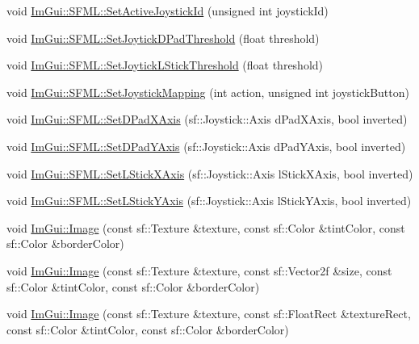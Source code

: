 \begin{DoxyCompactItemize}
\item 
void \mbox{\hyperlink{namespace_im_gui_1_1_s_f_m_l_a51d36e563d2086a841e75a41ecad36b5}{Im\+Gui\+::\+S\+F\+M\+L\+::\+Set\+Active\+Joystick\+Id}} (unsigned int joystick\+Id)
\item 
void \mbox{\hyperlink{namespace_im_gui_1_1_s_f_m_l_a54d0428403fd1887a604b3dc4c8be73b}{Im\+Gui\+::\+S\+F\+M\+L\+::\+Set\+Joytick\+D\+Pad\+Threshold}} (float threshold)
\item 
void \mbox{\hyperlink{namespace_im_gui_1_1_s_f_m_l_a9b55c21ae767d4157720c6bd140bc322}{Im\+Gui\+::\+S\+F\+M\+L\+::\+Set\+Joytick\+L\+Stick\+Threshold}} (float threshold)
\item 
void \mbox{\hyperlink{namespace_im_gui_1_1_s_f_m_l_ad29306aafc29f65a72ec8bcc1e86330f}{Im\+Gui\+::\+S\+F\+M\+L\+::\+Set\+Joystick\+Mapping}} (int action, unsigned int joystick\+Button)
\item 
void \mbox{\hyperlink{namespace_im_gui_1_1_s_f_m_l_ad5fc8ad9c8dfddae6034e86b2a23ff99}{Im\+Gui\+::\+S\+F\+M\+L\+::\+Set\+D\+Pad\+X\+Axis}} (sf\+::\+Joystick\+::\+Axis d\+Pad\+X\+Axis, bool inverted)
\item 
void \mbox{\hyperlink{namespace_im_gui_1_1_s_f_m_l_ad940e87612d00f2a733bfd8813b88523}{Im\+Gui\+::\+S\+F\+M\+L\+::\+Set\+D\+Pad\+Y\+Axis}} (sf\+::\+Joystick\+::\+Axis d\+Pad\+Y\+Axis, bool inverted)
\item 
void \mbox{\hyperlink{namespace_im_gui_1_1_s_f_m_l_a00ca41769ea566cb6210441bfe505028}{Im\+Gui\+::\+S\+F\+M\+L\+::\+Set\+L\+Stick\+X\+Axis}} (sf\+::\+Joystick\+::\+Axis l\+Stick\+X\+Axis, bool inverted)
\item 
void \mbox{\hyperlink{namespace_im_gui_1_1_s_f_m_l_a8e86bef226400c4591343e06670210d7}{Im\+Gui\+::\+S\+F\+M\+L\+::\+Set\+L\+Stick\+Y\+Axis}} (sf\+::\+Joystick\+::\+Axis l\+Stick\+Y\+Axis, bool inverted)
\item 
void \mbox{\hyperlink{namespace_im_gui_a6edd99e13610a7aa37d6befa622a33d5}{Im\+Gui\+::\+Image}} (const sf\+::\+Texture \&texture, const sf\+::\+Color \&tint\+Color, const sf\+::\+Color \&border\+Color)
\item 
void \mbox{\hyperlink{namespace_im_gui_ad6ab801840d7c487d66946ceca63632f}{Im\+Gui\+::\+Image}} (const sf\+::\+Texture \&texture, const sf\+::\+Vector2f \&size, const sf\+::\+Color \&tint\+Color, const sf\+::\+Color \&border\+Color)
\item 
void \mbox{\hyperlink{namespace_im_gui_a38a669345d55f897af0964def4acdc07}{Im\+Gui\+::\+Image}} (const sf\+::\+Texture \&texture, const sf\+::\+Float\+Rect \&texture\+Rect, const sf\+::\+Color \&tint\+Color, const sf\+::\+Color \&border\+Color)

\end{DoxyCompactItemize}
